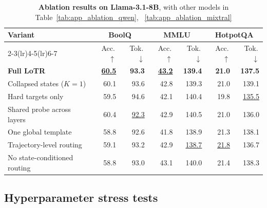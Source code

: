 \begin{table}[t]
\centering
\vspace{-3mm}
\caption{\textbf{Ablation results on Llama-3.1-8B}, with other models in Table~\ref{tab:app_ablation_qwen}, ~\ref{tab:app_ablation_mixtral}}
\label{tab:ablation_llama}
\vspace{-2mm}
\small
\setlength{\tabcolsep}{2.4pt}
\renewcommand{\arraystretch}{0.90}
\begin{tabular}{@{}p{4.74cm}rrrrrr@{}}
\toprule
\multirow{2}{*}[-2pt]{\textbf{Variant}} & \multicolumn{2}{c}{\textbf{BoolQ}} & \multicolumn{2}{c}{\textbf{MMLU}} & \multicolumn{2}{c}{\textbf{HotpotQA}} \\
\cmidrule(lr){2-3}\cmidrule(lr){4-5}\cmidrule(lr){6-7}
& Acc.\,$\uparrow$ & Tok.\,$\downarrow$ & Acc.\,$\uparrow$ & Tok.\,$\downarrow$ & Acc.\,$\uparrow$ & Tok.\,$\downarrow$ \\
\midrule
\cellcolor{cyan!10}\textbf{Full LoTR} & \cellcolor{cyan!10}\textbf{\underline{60.5}} & \cellcolor{cyan!10}\textbf{93.3} & \cellcolor{cyan!10}\textbf{\underline{43.2}} & \cellcolor{cyan!10}\textbf{139.4} & \cellcolor{cyan!10}\textbf{21.0} & \cellcolor{cyan!10}\textbf{137.5} \\
Collapsed states ($K{=}1$) & 60.1 & 93.6 & 42.8 & 139.3 & 21.0 & 139.1 \\
Hard targets only & 59.5 & 94.6 & 42.1 & 140.4 & 19.8 & \underline{135.5} \\
Shared probe across layers & 60.4 & \underline{92.3} & 42.9 & 140.5 & 21.0 & 136.0 \\
One global template & 58.8 & 92.6 & 41.8 & 138.9 & 21.3 & 138.1 \\
Trajectory-level routing & 59.1 & 93.2 & 42.9 & \underline{138.7} & \underline{21.8} & 136.7 \\
No state-conditioned routing & 58.8 & 93.0 & 43.1 & 140.0 & 21.4 & 138.3 \\
\bottomrule
\end{tabular}%
\vspace{-2mm}
\end{table}

\subsection{Hyperparameter stress tests}
\label{sec:param_stress}

